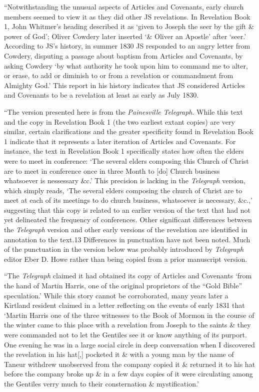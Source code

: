 			``Notwithstanding the unusual aspects of Articles and Covenants, early church members seemed to view it as they did other JS revelations. In Revelation Book 1, John Whitmer's heading described it as `given to Joseph the seer by the gift \& power of God'; Oliver Cowdery later inserted `\& Oliver an Apostle' after `seer.' According to JS's history, in summer 1830 JS responded to an angry letter from Cowdery, disputing a passage about baptism from Articles and Covenants, by asking Cowdery `by what authority he took upon him to command me to alter, or erase, to add or diminish to or from a revelation or commandment from Almighty God.' This report in his history indicates that JS considered Articles and Covenants to be a revelation at least as early as July 1830.

			``The version presented here is from the \textit{Painesville Telegraph}. While this text and the copy in Revelation Book 1 (the two earliest extant copies) are very similar, certain clarifications and the greater specificity found in Revelation Book 1 indicate that it represents a later iteration of Articles and Covenants. For instance, the text in Revelation Book 1 specifically states how often the elders were to meet in conference: `The several elders composing this Church of Christ are to meet in conference once in three Month to [do] Church business whatsoever is nessessary \&c.' This precision is lacking in the \textit{Telegraph} version, which simply reads, `The several elders composing the church of Christ are to meet at each of its meetings to do church business, whatsoever is necessary, \&c.,' suggesting that this copy is related to an earlier version of the text that had not yet delineated the frequency of conferences. Other significant differences between the \textit{Telegraph} version and other early versions of the revelation are identified in annotation to the text.13 Differences in punctuation have not been noted. Much of the punctuation in the version below was probably introduced by \textit{Telegraph} editor Eber D. Howe rather than being copied from a prior manuscript version.

			``The \textit{Telegraph} claimed it had obtained its copy of Articles and Covenants `from the hand of Martin Harris, one of the original proprietors of the ``Gold Bible'' speculation.' While this story cannot be corroborated, many years later a Kirtland resident claimed in a letter reflecting on the events of early 1831 that `Martin Harris one of the three witnesses to the Book of Mormon in the course of the winter came to this place with a revelation from Joseph to the saints \& they were commanded not to let the Gentiles see it or know anything of its purport. One evening he was in a large social circle in deep conversation when I discovered the revelation in his hat[,] pocketed it \& with a young man by the name of Taneur withdrew unobserved from the company copied it \& returned it to his hat before the company broke up \& in a few days copies of it were circulating among the Gentiles verry much to their consternation \& mystification.'

